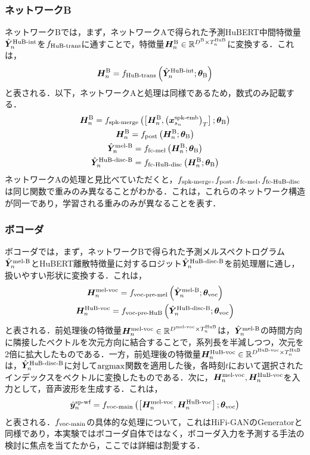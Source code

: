 \documentclass[12pt]{jarticle}
\numberwithin{equation}{section}    %
\numberwithin{figure}{section}      %
\numberwithin{table}{section}      %
\begin{document}
\subsubsection{ネットワークB}
ネットワークBでは，まず，ネットワークAで得られた予測HuBERT中間特徴量$\hat{\bm{Y}}^{\text{HuB-int}}_{n}$を$f_{\text{HuB-trans}}$に通すことで，特徴量$\bm{H}^{\text{B}}_{n} \in \mathbb{R}^{D^{\text{B}} \times T^{\text{HuB}}_{n}}$に変換する．これは，
\begin{equation}
    \bm{H}^{\text{B}}_{n} = f_{\text{HuB-trans}}\left(\hat{\bm{Y}}^{\text{HuB-int}}_{n}; \bm{\theta}_{\text{B}}\right)
\end{equation}
と表される．以下，ネットワークAと処理は同様であるため，数式のみ記載する．
\begin{gather}
    \bm{H}^{\text{B}}_{n} = f_{\text{spk-merge}}\left(\left[\bm{H}^{\text{B}}_{n}, \left(\bm{x}^{\text{spk-emb}}_{s_{n}}\right)_{T}\right]; \bm{\theta}_{\text{B}}\right) \\
    \bm{H}^{\text{B}}_{n} = f_{\text{post}}\left(\bm{H}^{\text{B}}_{n}; \bm{\theta}_{\text{B}}\right) \\
    \hat{\bm{Y}}^{\text{mel-B}}_{n} = f_{\text{fc-mel}}\left(\bm{H}^{\text{B}}_{n}; \bm{\theta}_{\text{B}}\right) \\
    \hat{\bm{Y}}^{\text{HuB-disc-B}}_{n} = f_{\text{fc-HuB-disc}}\left(\bm{H}^{\text{B}}_{n}; \bm{\theta}_{\text{B}}\right)
\end{gather}
ネットワークAの処理と見比べていただくと，$f_{\text{spk-merge}}, f_{\text{post}}, f_{\text{fc-mel}}, f_{\text{fc-HuB-disc}}$は同じ関数で重みのみ異なることがわかる．これは，これらのネットワーク構造が同一であり，学習される重みのみが異なることを表す．

\subsubsection{ボコーダ}
ボコーダでは，まず，ネットワークBで得られた予測メルスペクトログラム$\hat{\bm{Y}}^{\text{mel-B}}_{n}$とHuBERT離散特徴量に対するロジット$\hat{\bm{Y}}^{\text{HuB-disc-B}}_{n}$を前処理層に通し，扱いやすい形状に変換する．これは，
\begin{gather}
    \bm{H}^{\text{mel-voc}}_{n} = f_{\text{voc-pre-mel}}\left(\hat{\bm{Y}}^{\text{mel-B}}_{n}; \bm{\theta}_{\text{voc}}\right) \\
    \bm{H}^{\text{HuB-voc}}_{n} = f_{\text{voc-pre-HuB}}\left(\hat{\bm{Y}}^{\text{HuB-disc-B}}_{n}; \bm{\theta}_{\text{voc}}\right)
\end{gather}
と表される．前処理後の特徴量$\bm{H}^{\text{mel-voc}}_{n} \in \mathbb{R}^{D^{\text{mel-voc}} \times T^{\text{HuB}}_{n}}$は，$\hat{\bm{Y}}^{\text{mel-B}}_{n}$の時間方向に隣接したベクトルを次元方向に結合することで，系列長を半減しつつ，次元を2倍に拡大したものである．一方，前処理後の特徴量$\bm{H}^{\text{HuB-voc}}_{n} \in \mathbb{R}^{D^{\text{HuB-voc}} \times T^{\text{HuB}}_{n}}$は，$\hat{\bm{Y}}^{\text{HuB-disc-B}}_{n}$に対して$\text{argmax}$関数を適用した後，各時刻$t$において選択されたインデックスをベクトルに変換したものである．次に，$\bm{H}^{\text{mel-voc}}_{n}, \bm{H}^{\text{HuB-voc}}_{n}$を入力として，音声波形を生成する．これは，
\begin{equation}
    \hat{\bm{y}}^{\text{sp-wf}}_{n} = f_{\text{voc-main}}\left(\left[\bm{H}^{\text{mel-voc}}_{n}, \bm{H}^{\text{HuB-voc}}_{n}\right]; \bm{\theta}_{\text{voc}}\right)
\end{equation}
と表される．$f_{\text{voc-main}}$の具体的な処理について，これはHiFi-GANのGeneratorと同様であり，本実験ではボコーダ自体ではなく，ボコーダ入力を予測する手法の検討に焦点を当てたから，ここでは詳細は割愛する．
\end{document}
